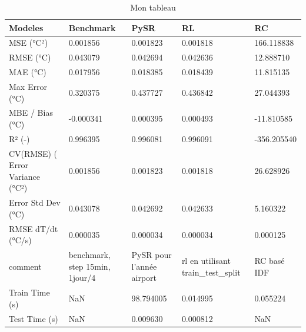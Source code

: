 \begin{table}
\caption{Mon tableau}
\label{tab:mon_tableau}
\begin{tabular}{lllll}
\toprule
Modeles & Benchmark & PySR & RL & RC \\
\midrule
MSE (°C²) & 0.001856 & 0.001823 & 0.001818 & 166.118838 \\
RMSE (°C) & 0.043079 & 0.042694 & 0.042636 & 12.888710 \\
MAE (°C) & 0.017956 & 0.018385 & 0.018439 & 11.815135 \\
Max Error (°C) & 0.320375 & 0.437727 & 0.436842 & 27.044393 \\
MBE / Bias (°C) & -0.000341 & 0.000395 & 0.000493 & -11.810585 \\
R² (-) & 0.996395 & 0.996081 & 0.996091 & -356.205540 \\
CV(RMSE) (%
Error Variance (°C²) & 0.001856 & 0.001823 & 0.001818 & 26.628926 \\
Error Std Dev (°C) & 0.043078 & 0.042692 & 0.042633 & 5.160322 \\
RMSE dT/dt (°C/s) & 0.000035 & 0.000034 & 0.000034 & 0.000125 \\
comment & benchmark, step 15min, 1jour/4 & PySR pour l'année airport & rl en utilisant train_test_split & RC basé IDF \\
Train Time (s) & NaN & 98.794005 & 0.014995 & 0.055224 \\
Test Time (s) & NaN & 0.009630 & 0.000812 & NaN \\
\bottomrule
\end{tabular}
\end{table}
